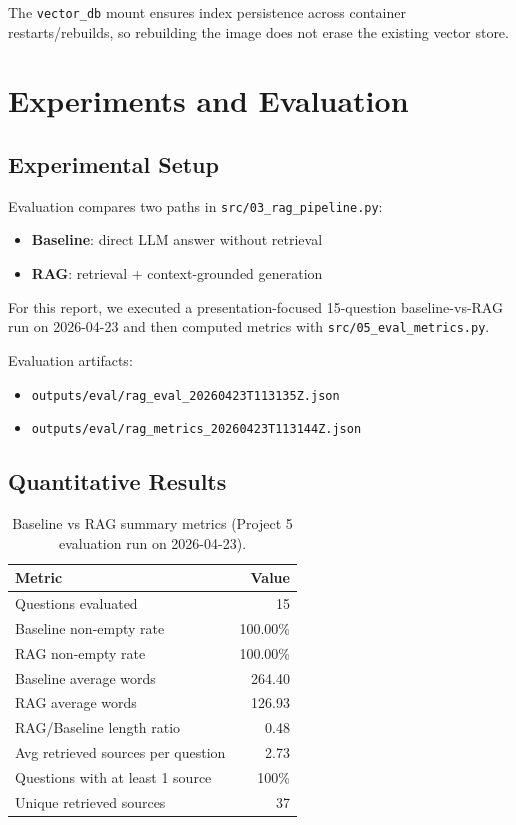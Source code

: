 \documentclass[11pt]{article}
\newcommand{\evalQuestions}{15}
\newcommand{\baselineAvgWords}{264.40}
\newcommand{\ragAvgWords}{126.93}
\newcommand{\lengthRatio}{0.48}
\newcommand{\avgSources}{2.73}
\newcommand{\sourceCoverage}{100\%}
\newcommand{\uniqueSources}{37}
\newcommand{\evalDate}{2026-04-23}
\begin{document}
The \texttt{vector\_db} mount ensures index persistence across container restarts/rebuilds, so rebuilding the image does not erase the existing vector store.

\section{Experiments and Evaluation}
\subsection{Experimental Setup}
Evaluation compares two paths in \texttt{src/03\_rag\_pipeline.py}:
\begin{itemize}
    \item \textbf{Baseline}: direct LLM answer without retrieval
    \item \textbf{RAG}: retrieval + context-grounded generation
\end{itemize}

For this report, we executed a presentation-focused 15-question baseline-vs-RAG run on \evalDate{} and then computed metrics with \texttt{src/05\_eval\_metrics.py}.

Evaluation artifacts:
\begin{itemize}
    \item \texttt{outputs/eval/rag\_eval\_20260423T113135Z.json}
    \item \texttt{outputs/eval/rag\_metrics\_20260423T113144Z.json}
\end{itemize}

\subsection{Quantitative Results}
\begin{table}[H]
\centering
\begin{tabular}{lr}
\toprule
\textbf{Metric} & \textbf{Value} \\
\midrule
Questions evaluated & \evalQuestions \\
Baseline non-empty rate & 100.00\% \\
RAG non-empty rate & 100.00\% \\
Baseline average words & \baselineAvgWords \\
RAG average words & \ragAvgWords \\
RAG/Baseline length ratio & \lengthRatio \\
Avg retrieved sources per question & \avgSources \\
Questions with at least 1 source & \sourceCoverage \\
Unique retrieved sources & \uniqueSources \\
\bottomrule
\end{tabular}
\caption{Baseline vs RAG summary metrics (Project 5 evaluation run on \evalDate{}).}
\label{tab:main-results}
\end{table}
\end{document}
